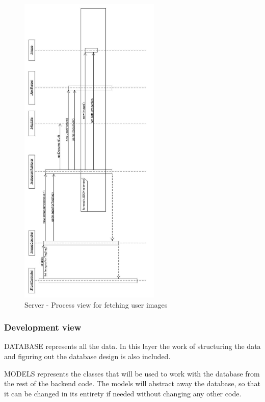 \documentclass[11pt]{book}
\begin{document}
\begin{figure}[H]
      \centering
      \includegraphics[width=0.6\textwidth]{Figures/Architecture/Sequence/image.jpg}
      \caption{Server - Process view for fetching user images}
      \label{fig:arch_server_process_image}
\end{figure}

\subsubsection{Development view}
DATABASE represents all the data. In this layer the work of structuring the data and figuring out the database design is also included.

MODELS represents the classes that will be used to work with the database from the rest of the backend code. The models will abstract away the database, so that it can be changed in its entirety if needed without changing any other code.
\end{document}
